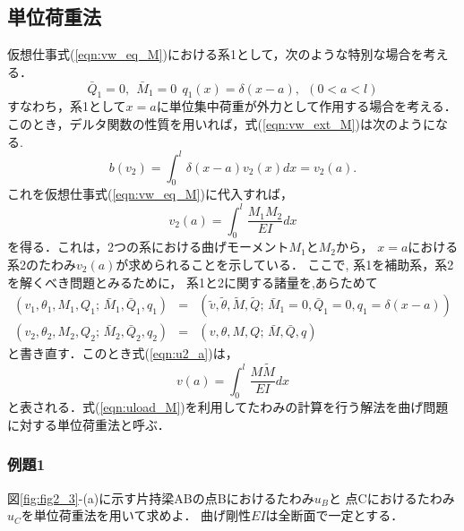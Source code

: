 \documentclass[10pt,a4j]{jarticle}
\begin{document}
\subsection{単位荷重法}
仮想仕事式(\ref{eqn:vw_eq_M})における系1として，次のような特別な場合を考える．
\begin{equation}
	\bar Q_1=0,\ \ \bar M_1=0\ \ q_1(x)=\delta(x-a), \ \ (0<a<l)
	\label{eqn:sys1_M}
\end{equation}
すなわち，系1として$x=a$に単位集中荷重が外力として作用する場合を考える．
このとき，デルタ関数の性質を用いれば，式(\ref{eqn:vw_ext_M})は次のようになる. 
\begin{equation}
	b(v_2)=\int_0^l \delta(x-a)v_2(x)dx= v_2(a).
	\label{eqn:vw_eq_dlt}
\end{equation}
これを仮想仕事式(\ref{eqn:vw_eq_M})に代入すれば，
\begin{equation}
	v_2(a)=\int_0^l \frac{M_1M_2}{EI}dx
	\label{eqn:u2_a}
\end{equation}
を得る．これは，2つの系における曲げモーメント$M_1$と$M_2$から，
$x=a$における系2のたわみ$v_2(a)$が求められることを示している．
ここで, 系1を補助系，系2を解くべき問題とみるために，
系1と2に関する諸量を,あらためて 
\begin{eqnarray}
	\left( v_1, \theta_1, M_1, Q_1;\, \bar M_1, \bar Q_1, q_1 \right)& = &
		\left(\tilde v, \tilde \theta, \tilde M, \tilde Q;\, 
		\bar M_1=0, \bar Q_1=0, q_1= \delta(x-a) \right) 
	\label{eqn:aux}
	\\
	\left( v_2, \theta_2, M_2, Q_2 ;\, \bar M_2, \bar Q_2, q_2 \right)& = &
		\left( v,\theta,M, Q;\, \bar M,\bar Q, q \right) 
	\label{eqn:prb_M}
\end{eqnarray}
と書き直す．このとき式(\ref{eqn:u2_a})は，
\begin{equation}
	v(a)=\int_0^l \frac{M \tilde M}{EI}dx
	\label{eqn:uload_M}
\end{equation}
と表される．式(\ref{eqn:uload_M})を利用してたわみの計算を行う解法を曲げ問題に対する単位荷重法と呼ぶ．
\subsubsection{例題1}
図\ref{fig:fig2_3}-(a)に示す片持梁ABの点Bにおけるたわみ$u_B$と
点Cにおけるたわみ$u_C$を単位荷重法を用いて求めよ．
曲げ剛性$EI$は全断面で一定とする．
\end{document}
